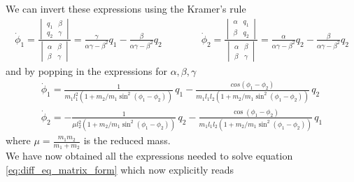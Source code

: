 \documentclass{article}
\begin{document}
We can invert these expressions using the Kramer's rule
\begin{gather*}
    \dot \phi_1 = \frac{\begin{vmatrix}q_1 & \beta \\ q_2 & \gamma \end{vmatrix}}{\begin{vmatrix}\alpha & \beta \\ \beta & \gamma \end{vmatrix}} = \frac{\gamma}{\alpha\gamma - \beta^2}q_1 - \frac{\beta}{\alpha\gamma - \beta^2}q_2 \qquad \qquad
    \dot \phi_2 = \frac{\begin{vmatrix}\alpha & q_1 \\ \beta & q_2 \end{vmatrix}}{\begin{vmatrix}\alpha & \beta \\ \beta & \gamma \end{vmatrix}} = \frac{\alpha}{\alpha \gamma - \beta^2}q_2 - \frac{\beta}{\alpha\gamma - \beta^2}q_2 
\end{gather*}
and by popping in the expressions for $\alpha, \beta, \gamma$
\begin{gather*}
    \dot \phi_1 = \frac{1}{m_1 l_1^2(1 + m_2/m_1 \sin^2(\phi_1 - \phi_2))} \, q_1 - \frac{cos(\phi_1 - \phi_2)}{m_1l_1l_2(1+m_2/m_1\sin^2(\phi_1 - \phi_2))} \, q_2 \\
    \dot \phi_2 = - \frac{1}{\mu l_2^2(1 + m_2/m_1\sin^2(\phi_1 - \phi_2))} \, q_2 - \frac{\cos(\phi_1 - \phi_2)}{m_1 l_1 l_2 (1+m_2/m_1 \sin^2(\phi_1 - \phi_2))} \, q_1
\end{gather*}
where $\mu = \frac{m_1 m_2}{m_1 + m_2}$ is the reduced mass. \\
We have now obtained all the expressions needed to solve equation \ref{eq:diff_eq_matrix_form} which now explicitly reads
\end{document}
